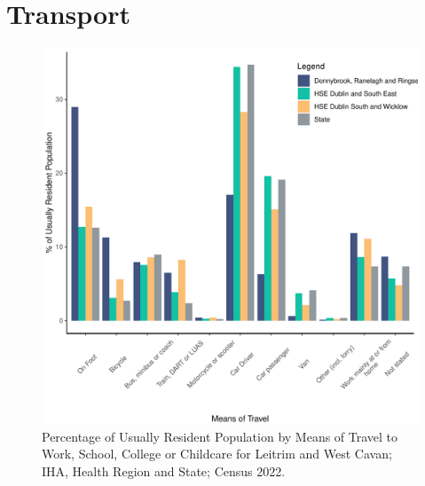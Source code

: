 \documentclass{article}
\begin{document}
\section{Transport}\label{sect:Trans}
\begin{figure}[H]
	\centering
	\includegraphics[width = 120mm]{../figures/TravelED.pdf}
	\caption{Percentage of Usually Resident Population by Means of Travel to Work, School, College or Childcare for Leitrim and West Cavan; IHA, Health Region and State; Census 2022.}
	\label{fig:vbnv}
	\end{figure}
\end{document}
